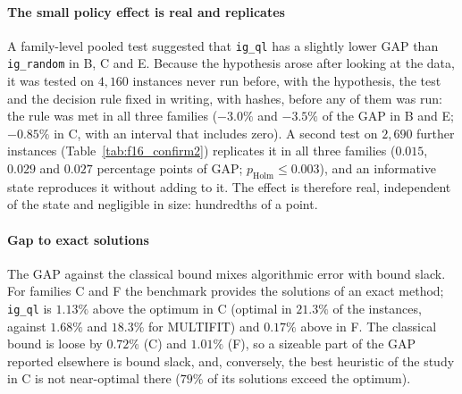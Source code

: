 \paragraph{The small policy effect is real and replicates}
A family-level pooled test suggested that \texttt{ig\_ql} has a slightly lower GAP than \texttt{ig\_random} in B, C and E. Because the hypothesis arose after looking at the data, it was tested on $4{,}160$ instances never
run before, with the hypothesis, the test and the decision rule fixed in writing, with hashes, before any of them was run: the rule was met in all three families ($-3.0\%$ and $-3.5\%$ of the GAP in B and E; $-0.85\%$
in C, with an interval that includes zero). A second test on $2{,}690$ further instances (Table~\ref{tab:f16_confirm2}) replicates it in all three families ($0.015$, $0.029$ and $0.027$ percentage points of GAP;
$p_{\mathrm{Holm}}\leq0.003$), and an informative state reproduces it without adding to it. The effect is therefore real, independent of the state and negligible in size: hundredths of a point.



\paragraph{Gap to exact solutions}
The GAP against the classical bound mixes algorithmic error with bound slack. For families C and F the benchmark provides the solutions of an exact method; \texttt{ig\_ql} is $1.13\%$ above the optimum in C
(optimal in $21.3\%$ of the instances, against $1.68\%$ and $18.3\%$ for MULTIFIT) and $0.17\%$ above in F. The classical bound is loose by $0.72\%$ (C) and $1.01\%$ (F), so a sizeable part of the GAP reported
elsewhere is bound slack, and, conversely, the best heuristic of the study in C is not near-optimal there ($79\%$ of its solutions exceed the optimum).
